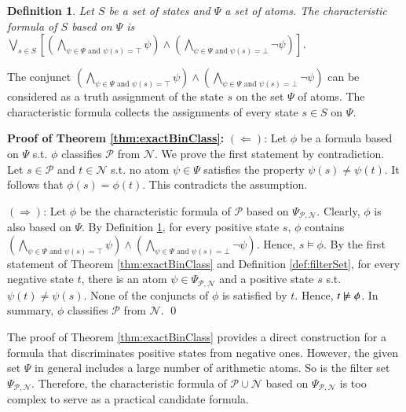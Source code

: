 \documentclass[review]{elsarticle}
\newcommand{\nmodels}{\mathrel{\ooalign{$\models$\cr\hfil$/$\hfil\cr}}}
\newcommand{\true}{\top}
\newcommand{\false}{\bot}
\newcommand{\positiveSet}{\mathcal{P}}
\newcommand{\negativeSet}{\mathcal{N}}
\newcommand{\featureSet}{\Psi}
\newtheorem{definition}{Definition}
\begin{document}
	\begin{definition}\label{def:charForm} \rm
		Let $S$ be a set of states and $\featureSet$ a set of atoms.
		The \textit{characteristic formula} of $S$ based on $\featureSet$ is $\bigvee_{s \in S} \left[\left(\bigwedge_{\psi \in \featureSet \text{ and } \psi(s) = \true} \psi\right) \land \left(\bigwedge_{\psi \in \featureSet \text{ and } \psi(s) = \false} \neg \psi\right) \right]$.
	\end{definition}
	
	The conjunct $\left(\bigwedge_{\psi \in \featureSet \text{ and } \psi(s) = \true} \psi\right) \land \left(\bigwedge_{\psi \in \featureSet \text{ and } \psi(s) = \false} \neg \psi\right)$ can be considered as a truth assignment of the state $s$ on the set $\featureSet$ of atoms.
	The characteristic formula collects the assignments of every state $s \in S$ on $\featureSet$.
	
	
	{\bf Proof of Theorem \ref{thm:exactBinClass}: }
		$(\Leftarrow)$:
		Let $\phi$ be a formula based on $\featureSet$ s.t. $\phi$ classifies $\positiveSet$ from $\negativeSet$. 			
		We prove the first statement by	contradiction.
		Let $s \in \positiveSet$ and $t \in \negativeSet$ s.t. no atom $\psi \in \featureSet$ satisfies the property $\psi(s) \neq \psi(t)$.
		It follows that $\phi(s) = \phi(t)$.
		This contradicts the assumption.   			
		
		$(\Rightarrow)$: 
		Let $\phi$ be the characteristic formula of $\positiveSet$ based on $\featureSet_{\positiveSet, \negativeSet}$.
		Clearly, $\phi$ is also based on $\featureSet$.
		By Definition \ref{def:charForm}, for every positive state $s$, $\phi$ contains $\left(\bigwedge_{\psi \in \featureSet \text{ and } \psi(s) = \true} \psi\right) \land \left(\bigwedge_{\psi \in \featureSet \text{ and } \psi(s) = \false} \neg \psi\right)$.
		Hence, $s \models \phi$.
		By the first statement of Theorem \ref{thm:exactBinClass} and Definition \ref{def:filterSet}, for every negative state $t$, there is an atom $\psi \in \featureSet_{\positiveSet, \negativeSet}$ and a positive state $s$ s.t. $\psi(t) \neq \psi(s)$.
		None of the conjuncts of $\phi$ is satisfied by $t$.
		Hence, $t \nmodels \phi$.
		In summary, $\phi$ classifies $\positiveSet$ from $\negativeSet$. \qed

	The proof of Theorem \ref{thm:exactBinClass} provides a direct construction for a formula that discriminates positive states from negative ones.
	However, the given set $\featureSet$ in general includes a large number of arithmetic atoms.
	So is the filter set $\featureSet_{\positiveSet, \negativeSet}$.
	Therefore, the characteristic formula of $\positiveSet \cup \negativeSet$ based on $\featureSet_{\positiveSet, \negativeSet}$ is too complex to serve as a practical candidate formula.
		
\end{document}
